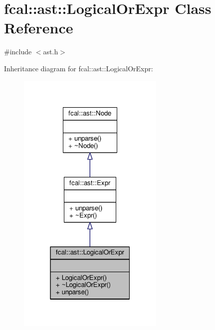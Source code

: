 \hypertarget{classfcal_1_1ast_1_1LogicalOrExpr}{}\section{fcal\+:\+:ast\+:\+:Logical\+Or\+Expr Class Reference}
\label{classfcal_1_1ast_1_1LogicalOrExpr}


{\ttfamily \#include $<$ast.\+h$>$}



Inheritance diagram for fcal\+:\+:ast\+:\+:Logical\+Or\+Expr\+:
\nopagebreak
\begin{figure}[H]
\begin{center}
\leavevmode
\includegraphics[width=199pt]{classfcal_1_1ast_1_1LogicalOrExpr__inherit__graph}
\end{center}
\end{figure}



